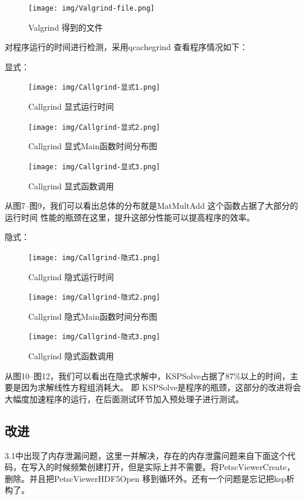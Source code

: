 \documentclass[10pt, a4paper]{article}
\begin{document}
\begin{figure}[!h]
\centering
\texttt{[image: img/Valgrind-file.png]}
\caption{Valgrind 得到的文件}
\label{fig:1}
\end{figure}

对程序运行的时间进行检测，采用qcachegrind 查看程序情况如下：

显式：
\begin{figure}[!h]
\centering
\texttt{[image: img/Callgrind-显式1.png]}
\caption{Callgrind 显式运行时间}
\label{fig:1}
\end{figure}
\begin{figure}[!h]
\centering
\texttt{[image: img/Callgrind-显式2.png]}
\caption{Callgrind 显式Main函数时间分布图}
\label{fig:1}
\end{figure}
\begin{figure}[!h]
\centering
\texttt{[image: img/Callgrind-显式3.png]}
\caption{Callgrind 显式函数调用}
\label{fig:1}
\end{figure}

从图7--图9，我们可以看出总体的分布就是MatMultAdd 这个函数占据了大部分的运行时间
性能的瓶颈在这里，提升这部分性能可以提高程序的效率。

隐式：

\begin{figure}[!h]
\centering
\texttt{[image: img/Callgrind-隐式1.png]}
\caption{Callgrind 隐式运行时间}
\label{fig:1}
\end{figure}
\begin{figure}[!h]
\centering
\texttt{[image: img/Callgrind-隐式2.png]}
\caption{Callgrind 隐式Main函数时间分布图}
\label{fig:1}
\end{figure}
\begin{figure}[!h]
\centering
\texttt{[image: img/Callgrind-隐式3.png]}
\caption{Callgrind 隐式函数调用}
\label{fig:1}
\end{figure}
从图10--图12，我们可以看出在隐式求解中，KSPSolve占据了87\%以上的时间，主要是因为求解线性方程组消耗大。
即 KSPSolve是程序的瓶颈，这部分的改进将会大幅度加速程序的运行，在后面测试环节加入预处理子进行测试。


\subsection{改进}
3.1中出现了内存泄漏问题，这里一并解决，存在的内存泄露问题来自下面这个代码，在写入的时候频繁创建打开，但是实际上并不需要。将PetscViewerCreate，删除。并且把PetscViewerHDF5Open 移到循环外。还有一个问题是忘记把ksp析构了。
\end{document}
